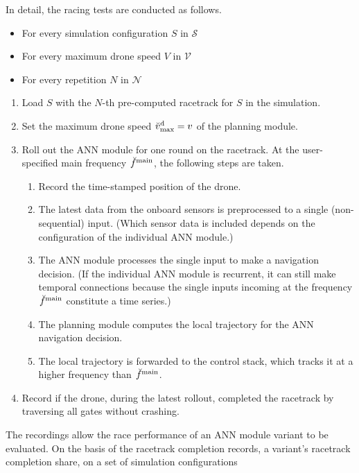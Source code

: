 In detail, the racing tests are conducted as follows.
\begin{itemize}
    \item For every simulation configuration $S$ in $\mathcal{S}$
    \item For every maximum drone speed $V$ in $\mathcal{V}$
    \item For every repetition $N$ in $\mathcal{N}$
\end{itemize}
\begin{enumerate}
    \item Load $S$ with the $N$-th pre-computed racetrack for $S$ in the simulation.
    \item Set the maximum drone speed $\speed[\user]{\drone}{\mxm}{}{} = v$
    of the planning module.
    \item Roll out the ANN module for one round on the racetrack.
    At the user-specified main frequency $\freq[\user]{\main}{}{}{}$, 
    the following steps are taken.
    \begin{enumerate}
        \item Record the time-stamped position of the drone.
        \item The latest data from the onboard sensors is preprocessed
        to a single (non-sequential) input.
        (Which sensor data is included depends on the configuration of the individual ANN module.)
        \item The ANN module processes the single input
        to make a navigation decision. 
        (If the individual ANN module is recurrent, it can still make temporal connections
        because the single inputs incoming at the frequency $\freq[\user]{\main}{}{}{}$
        constitute a time series.)
        \item The planning module computes the local trajectory for the ANN navigation decision.
        \item The local trajectory is forwarded to the control stack,
        which tracks it at a higher frequency than $\freq[\user]{\main}{}{}{}$.
    \end{enumerate}
    \item Record if the drone, during the latest rollout, 
    completed the racetrack
    by traversing all gates without crashing. 
\end{enumerate}
The recordings allow the race performance 
of an ANN module variant to be evaluated.
On the basis of the racetrack completion records,
a variant's racetrack completion share,
on a set of simulation configurations 
